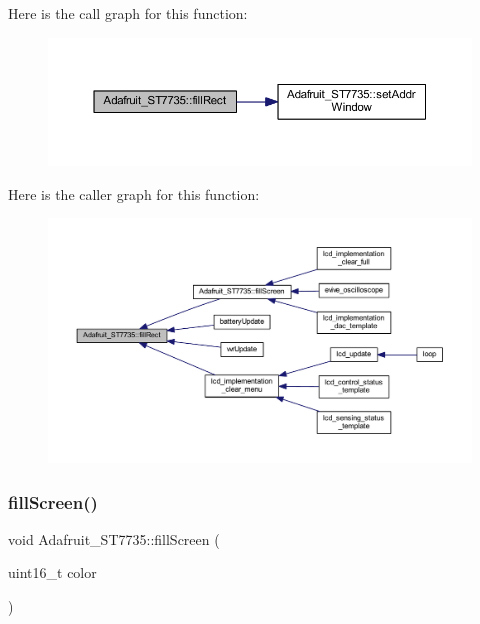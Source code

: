 Here is the call graph for this function\+:\nopagebreak
\begin{figure}[H]
\begin{center}
\leavevmode
\includegraphics[width=350pt]{class_adafruit___s_t7735_a3556265c5b017cd2cdceb1f34e9bc421_cgraph}
\end{center}
\end{figure}
Here is the caller graph for this function\+:\nopagebreak
\begin{figure}[H]
\begin{center}
\leavevmode
\includegraphics[width=350pt]{class_adafruit___s_t7735_a3556265c5b017cd2cdceb1f34e9bc421_icgraph}
\end{center}
\end{figure}
\mbox{\label{class_adafruit___s_t7735_af732d3d78239687718bb117de99418ca}} 
\subsubsection{\texorpdfstring{fill\+Screen()}{fillScreen()}}
{\footnotesize\ttfamily void Adafruit\+\_\+\+S\+T7735\+::fill\+Screen (\begin{DoxyParamCaption}\item[{uint16\+\_\+t}]{color }\end{DoxyParamCaption})}

